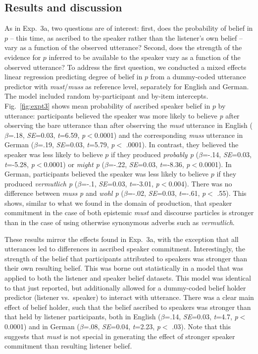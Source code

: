 \documentclass[11pt]{article}
\begin{document}
\subsection{Results and discussion}

As in Exp.~3a, two questions are of interest: first, does the probability of  belief in $p$ -- this time, as ascribed to the speaker rather than the listener's own belief --  vary as a function of the observed utterance? Second, does the strength of the evidence for $p$ inferred to be available to the speaker vary as a function of the observed utterance? To address the first question, we conducted a mixed effects linear regression predicting degree of belief in $p$ from a dummy-coded utterance predictor with \emph{must}/\emph{muss} as reference level, separately for English and German. The model included random by-participant and by-item intercepts. Fig.~\ref{fig:expt3} shows mean probability of ascribed speaker belief in $p$ by utterance: participants believed the speaker was more likely to believe \emph{p}  after observing the bare utterance than after observing the \emph{must} utterance in English   ($\beta$=.18, \emph{SE}=0.03, \emph{t}=6.59, \emph{p}$<$0.0001) and the corresponding \emph{muss} utterance in German ($\beta$=.19, \emph{SE}=0.03, \emph{t}=5.79, \emph{p}$<$ .0001). In contrast, they believed the speaker was less likely to believe $p$ if they produced \emph{probably p} ($\beta$=-.14, \emph{SE}=0.03, \emph{t}=-5.28, \emph{p}$<$0.0001) or \emph{might p} ($\beta$=-.22, \emph{SE}=0.03, \emph{t}=-8.36, \emph{p}$<$0.0001). In German, participants believed the speaker was less likely to believe $p$ if they produced \emph{vermutlich p} ($\beta$=-.1, \emph{SE}=0.03, \emph{t}=-3.01, \emph{p}$<$0.004). There was no difference between \emph{muss p} and \emph{wohl p} ($\beta$=-.02, \emph{SE}=0.03, \emph{t}=-.61, \emph{p}$<$ .55).  This shows, similar to what we found in the domain of production, that speaker commitment in the case of both epistemic \emph{must} and discourse particles is stronger than in the case of using otherwise synonymous adverbs such as \emph{vermutlich}.

These results mirror the effects found in Exp.~3a, with the exception that all utterances led to differences in ascribed speaker commitment. Interestingly, the strength of the belief that participants attributed to speakers was stronger than their own resulting belief. This was borne out statistically in a model that was applied to both the listener and speaker belief datasets. This model was identical to that just reported, but additionally allowed for a dummy-coded belief holder predictor (listener vs.~speaker)  to interact with utterance. There was a clear main effect of belief holder, such that the belief ascribed to speakers was stronger than that held by listener participants, both in English ($\beta$=.14, \emph{SE}=0.03, \emph{t}=4.7, \emph{p}$<$0.0001) and in German ($\beta$=.08, \emph{SE}=0.04, \emph{t}=2.23, \emph{p}$<$ .03). Note that this suggests that \emph{must} is not special in generating the effect of stronger speaker commitment than resulting listener belief.
\end{document}
